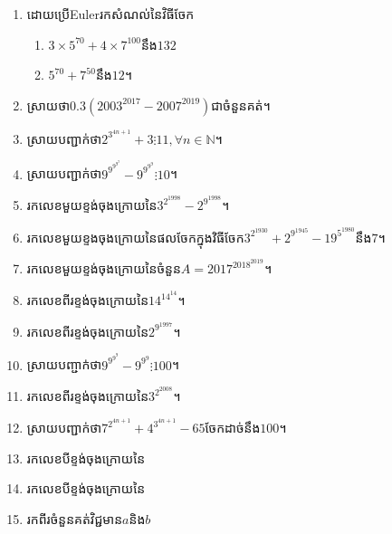 \documentclass[a4paper,12pt]{book}
\newcommand{\en}{\fontspec{Times New Roman}\selectfont}
\newcommand{\N}{\mathbb{N}}
\begin{document}
\begin{enumerate}[1]
\begin{enumerate}[a]
\end{enumerate}
\item ដោយប្រើ{\en Euler}រកសំណល់នៃវិធីចែក
\begin{enumerate}[a]
\item $3\times 5^{70}+4\times 7^{100}$នឹង$132$
\item $5^{70}+7^{50}$នឹង$12$។
\end{enumerate}
\item ស្រាយថា$0.3(2003^{2017}-2007^{2019})$ជាចំនួនគត់។
\item ស្រាយបញ្ជាក់ថា$2^{3^{4n+1}}+3 \vdots 11, \forall n \in{\N}$។
\item ស្រាយបញ្ជាក់ថា$9^{9^{9^{9^{9}}}}-9^{9^{9^{9}}} \vdots 10$។
\item រកលេខមួយខ្ទង់ចុងក្រោយនៃ$3^{2^{1998}}-2^{9^{1998}}$។
\item រកលេខមួយខ្ទងចុងក្រោយនៃផលចែកក្នុងវិធីចែក$3^{2^{1930}}+2^{9^{1945}}-19^{5^{1980}}$នឹង$7$។
\item រកលេខមួយខ្ទង់ចុងក្រោយនៃចំនួន$A=2017^{2018^{2019}}$។
\item រកលេខពីរខ្ទង់ចុងក្រោយនៃ$14^{14^{14}}$។
\item រកលេខពីរខ្ទង់ចុងក្រោយនៃ$2^{9^{1997}}$។
\item ស្រាយបញ្ជាក់ថា$9^{9^{9^{9}}}-9^{9^{9}}\vdots 100$។
\item រកលេខពីរខ្ទង់ចុងក្រោយនៃ$3^{2^{2008}}$។
\item ស្រាយបញ្ជាក់ថា$7^{2^{4n+1}}+4^{3^{4n+1}}-65$ចែកដាច់នឹង$100$។
\item រកលេខបីខ្ទង់ចុងក្រោយនៃ
\begin{enumerate}[a]
\end{enumerate}
\item រកលេខបីខ្ទង់ចុងក្រោយនៃ
\begin{enumerate}[a]
\end{enumerate}
\item រកពីរចំនួនគត់វិជ្ជមាន$a$និង$b$
\begin{multicols}{2}

\end{multicols}
\end{enumerate}
\end{document}
